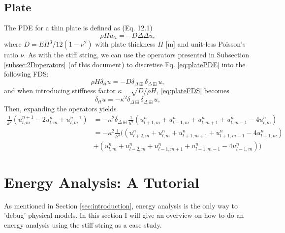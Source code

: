 \documentclass{article}
\begin{document}
\subsection{Plate}
The PDE for a thin plate is defined as (Eq. 12.1)
\begin{equation}\label{eq:platePDE}
    \rho H u_{tt} = -D\Delta\Delta u,
\end{equation}
where $D = EH^3/12(1-\nu^2)$ with plate thickness $H$ [m] and unit-less Poisson's ratio $\nu$. As with the stiff string, we can use the operators presented in Subsection \ref{subsec:2Doperators} (of this document) to discretise Eq. \eqref{eq:platePDE} into the following FDS: 
\begin{equation}\label{eq:plateFDS}
    \rho H \delta_{tt}u = -D\delta_{\Delta\boxplus}\delta_{\Delta\boxplus} u,
\end{equation}
and when introducing stiffness factor $\kappa =\sqrt{D/\rho H}$, \eqref{eq:plateFDS} becomes
\begin{equation}\label{eq:plateFDS}
    \delta_{tt}u = -\kappa^2\delta_{\Delta\boxplus}\delta_{\Delta\boxplus} u,
\end{equation}
Then, expanding the operators yields
\begin{equation}
\begin{aligned}
\frac{1}{k^2}(u_{l,m}^{n+1}-2u_{l,m}^n+u_{l,m}^{n-1}) &= -\kappa^2\delta_{\Delta\boxplus}\frac{1}{h^2}(u_{l+1, m}^n + u_{l-1, m}^n + u_{l, m+1}^n + u_{l, m-1}^n - 4 u_{l, m}^n)\\
&=-\kappa^2\frac{1}{h^4}\big((u_{l+2, m}^n + u_{l, m}^n + u_{l+1, m+1}^n + u_{l+1, m-1}^n - 4 u_{l+1, m}^n)\\
&+(u_{l, m}^n + u_{l-2, m}^n + u_{l-1, m+1}^n + u_{l-1, m-1}^n - 4 u_{l-1, m}^n)\big)
\end{aligned}
\end{equation}

\section{Energy Analysis: A Tutorial}\label{sec:energy}
As mentioned in Section \ref{sec:introduction}, energy analysis is the only way to 'debug' physical models. In this section I will give an overview on how to do an energy analysis using the stiff string as a case study. 
\end{document}

